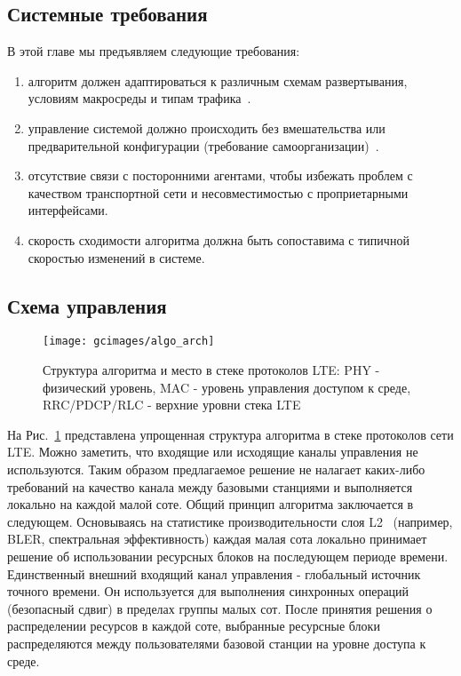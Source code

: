 \subsection{Системные требования}
В этой главе мы предъявляем следующие требования:
\begin{enumerate}
\item алгоритм должен адаптироваться к различным схемам развертывания, условиям макросреды и типам трафика~\cite{TS36.300}.
\item управление системой должно происходить без вмешательства или предварительной конфигурации (требование самоорганизации)~\cite{TS36.902}.
\item отсутствие связи с посторонними агентами, чтобы избежать проблем с качеством транспортной сети и несовместимостью с проприетарными интерфейсами.
\item скорость сходимости алгоритма должна быть сопоставима с типичной скоростью изменений в системе.
\end{enumerate}

\subsection{Схема управления}
\begin{figure}
    \centering
    \texttt{[image: gcimages/algo\_arch]}
    \caption{Структура алгоритма и место в стеке протоколов LTE: PHY - физический уровень, MAC - уровень управления доступом к среде, RRC/PDCP/RLC - верхние уровни стека LTE}
    \label{fig:algo_arch}
\end{figure}

На Рис.~\ref{fig:algo_arch} представлена упрощенная структура алгоритма в стеке протоколов сети LTE. Можно заметить, что входящие или исходящие каналы управления не используются. Таким образом предлагаемое решение не налагает каких-либо требований на качество канала между базовыми станциями и выполняется локально на каждой малой соте.
Общий принцип алгоритма заключается в следующем. Основываясь на статистике производительности слоя L2~\cite{TS36.300} (например, BLER, спектральная эффективность) каждая малая сота локально принимает решение об использовании ресурсных блоков на последующем периоде времени. Единственный внешний входящий канал управления - глобальный источник точного времени. Он используется для выполнения синхронных операций (безопасный сдвиг) в пределах группы малых сот. После принятия решения о распределении ресурсов в каждой соте, выбранные ресурсные блоки  распределяются между пользователями базовой станции на уровне доступа к среде.

